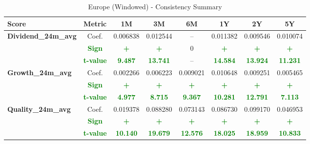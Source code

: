\documentclass[11pt,english,a4paper,hidelinks]{book}
\begin{document}
\begin{table}[H]
    \centering
    \caption{Europe (Windowed) - Consistency Summary}
    \begin{tabular}{lccccccc}
        \toprule
        \textbf{Score} & \textbf{Metric} & \textbf{1M} & \textbf{3M} & \textbf{6M} & \textbf{1Y} & \textbf{2Y} & \textbf{5Y} \\
        \midrule
        \multirow{3}{*}{\textbf{Dividend\_24m\_avg}} 
        & Coef.   & 0.006838 & 0.012544 & -- & 0.011382 & 0.009546 & 0.010074 \\
        & \textbf{\textcolor{green}{Sign}}    & \textbf{\textcolor{green}{+}}        & \textbf{\textcolor{green}{+}}        & 0  & \textbf{\textcolor{green}{+}}        & \textbf{\textcolor{green}{+}}        & \textbf{\textcolor{green}{+}}        \\
        & \textbf{\textcolor{green}{t-value}} & \textbf{\textcolor{green}{9.487}}    & \textbf{\textcolor{green}{13.741}}   & -- & \textbf{\textcolor{green}{14.584}}   & \textbf{\textcolor{green}{13.924}}   & \textbf{\textcolor{green}{11.231}}   \\
        \midrule
        \multirow{3}{*}{\textbf{Growth\_24m\_avg}}
            & Coef.   & 0.002266  & 0.006223  & 0.009021  & 0.010648  & 0.009251  & 0.005465  \\
            & \textbf{\textcolor{green}{Sign}}    & \textbf{\textcolor{green}{+}}         & \textbf{\textcolor{green}{+}}         & \textbf{\textcolor{green}{+}}         & \textbf{\textcolor{green}{+}}         & \textbf{\textcolor{green}{+}}         & \textbf{\textcolor{green}{+}}         \\
            & \textbf{\textcolor{green}{t-value}} & \textbf{\textcolor{green}{4.977}}     & \textbf{\textcolor{green}{8.715}}     & \textbf{\textcolor{green}{9.367}}     & \textbf{\textcolor{green}{10.281}}    & \textbf{\textcolor{green}{12.791}}    & \textbf{\textcolor{green}{7.113}}     \\
        \midrule
        \multirow{3}{*}{\textbf{Quality\_24m\_avg}}
            & Coef.   & 0.019378 & 0.088280 & 0.073143 & 0.086730 & 0.099170 & 0.046953 \\
            & \textbf{\textcolor{green}{Sign}}    & \textbf{\textcolor{green}{+}}        & \textbf{\textcolor{green}{+}}        & \textbf{\textcolor{green}{+}}        & \textbf{\textcolor{green}{+}}        & \textbf{\textcolor{green}{+}}        & \textbf{\textcolor{green}{+}}        \\
            & \textbf{\textcolor{green}{t-value}} & \textbf{\textcolor{green}{10.140}}   & \textbf{\textcolor{green}{19.679}}   & \textbf{\textcolor{green}{12.576}}   & \textbf{\textcolor{green}{18.025}}   & \textbf{\textcolor{green}{18.959}}   & \textbf{\textcolor{green}{10.833}}   \\
        \midrule
        

\end{tabular}
\end{table}
\end{document}

